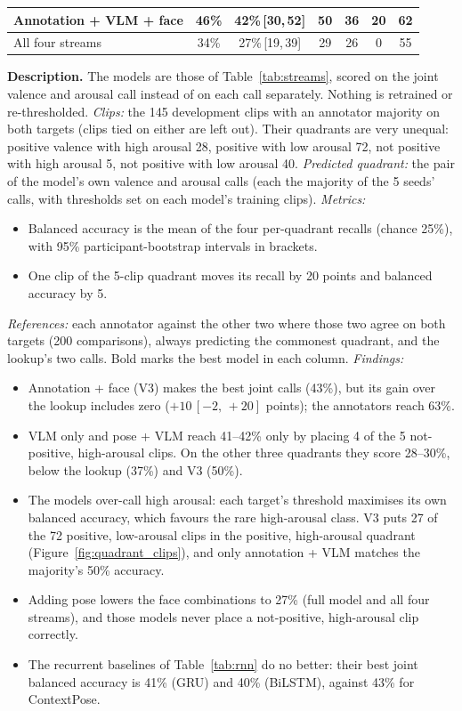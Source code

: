 \documentclass[11pt]{article}
\newcommand{\best}[1]{\textbf{#1}}
\newcommand{\ci}[2]{\,[#1,\,#2]}
\newcommand{\tabledesc}[1]{\par\medskip\begin{minipage}{\linewidth}\footnotesize\textbf{Description.} #1\end{minipage}}
\begin{document}
\begin{table}[!htbp]
{\begin{tabular}{lcccccc}
Annotation + VLM + face & 46\% & 42\%\ci{30}{52} & 50 & 36 & 20 & \best{62} \\
\midrule
All four streams & 34\% & 27\%\ci{19}{39} & 29 & 26 & 0 & 55 \\
\bottomrule
\end{tabular}%
}
\tabledesc{The models are those of Table~\ref{tab:streams}, scored on the joint valence and arousal call instead of on each call separately. Nothing is retrained or re-thresholded.
\emph{Clips:} the 145 development clips with an annotator majority on both targets (clips tied on either are left out). Their quadrants are very unequal: positive valence with high arousal 28, positive with low arousal 72, not positive with high arousal 5, not positive with low arousal 40.
\emph{Predicted quadrant:} the pair of the model's own valence and arousal calls (each the majority of the 5 seeds' calls, with thresholds set on each model's training clips).
\emph{Metrics:}
\begin{itemize}
  \item Balanced accuracy is the mean of the four per-quadrant recalls (chance 25\%), with 95\% participant-bootstrap intervals in brackets.
  \item One clip of the 5-clip quadrant moves its recall by 20 points and balanced accuracy by 5.
\end{itemize}
\emph{References:} each annotator against the other two where those two agree on both targets (200 comparisons), always predicting the commonest quadrant, and the lookup's two calls. Bold marks the best model in each column.
\emph{Findings:}
\begin{itemize}
  \item Annotation + face (V3) makes the best joint calls (43\%), but its gain over the lookup includes zero ($+10\ci{-2}{+20}$ points); the annotators reach 63\%.
  \item VLM only and pose + VLM reach 41--42\% only by placing 4 of the 5 not-positive, high-arousal clips. On the other three quadrants they score 28--30\%, below the lookup (37\%) and V3 (50\%).
  \item The models over-call high arousal: each target's threshold maximises its own balanced accuracy, which favours the rare high-arousal class. V3 puts 27 of the 72 positive, low-arousal clips in the positive, high-arousal quadrant (Figure~\ref{fig:quadrant_clips}), and only annotation + VLM matches the majority's 50\% accuracy.
  \item Adding pose lowers the face combinations to 27\% (full model and all four streams), and those models never place a not-positive, high-arousal clip correctly.
  \item The recurrent baselines of Table~\ref{tab:rnn} do no better: their best joint balanced accuracy is 41\% (GRU) and 40\% (BiLSTM), against 43\% for ContextPose.
\end{itemize}}
\end{table}
\end{document}
